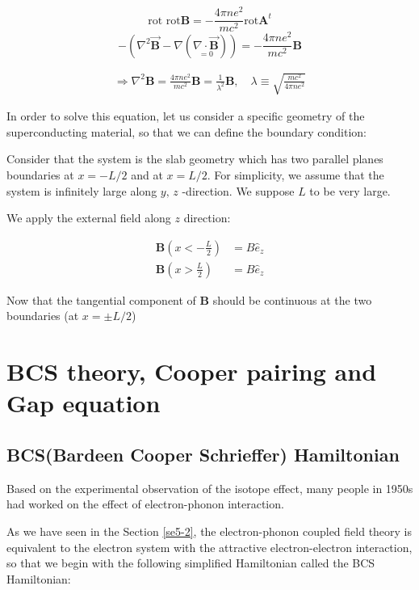 \[\text{rot\ rot}\bm{B} = -\frac{4\pi ne^2}{mc^2}\text{rot}\bm{A}^t \]
\[-\left(\nabla^2\vec{\bm{B}} - \nabla (\underset{=0}{\nabla \cdot \vec{\bm{B}}})\right) = -\frac{4\pi ne^2}{mc^2}\bm{B} \]

\begin{align} \tag{A}
\Rightarrow \nabla^2 \bm{B} = \frac{4\pi ne^2}{mc^2}\bm{B} = \frac{1}{\lambda^2}\bm{B},\quad \lambda \equiv \sqrt{\frac{mc^2}{4\pi ne^2}} 
\end{align}

In order to solve this equation, let us consider a specific geometry of the superconducting material, so that we can define the boundary condition: 

Consider that the system is the slab geometry which has two parallel planes boundaries at $x = -L/2$ and at $x = L/2$. For simplicity, we assume that the system is infinitely large along $y,\, z$ -direction. We suppose $L$ to be very large. 

We apply the external field along $z$ direction: 

\[\begin{split}
\bm B\left(x < -\frac{L}{2}\right) &= B\hat{e}_z\\
\bm B\left(x > \frac{L}{2}\right) &= B\hat{e}_z
\end{split} \]

Now that the tangential component of $\bm{B}$ should be continuous at the two boundaries (at $x = \pm L/2$)







\section{BCS theory, Cooper pairing and Gap equation}

\subsection{BCS(Bardeen Cooper Schrieffer) Hamiltonian}



Based on the experimental observation of the isotope effect, many people in 1950s had worked on the effect of electron-phonon interaction. 

As we have seen in the Section {\ref{se5-2}}, the electron-phonon coupled field theory is equivalent to the electron system with the attractive electron-electron interaction, so that we begin with the following simplified Hamiltonian called the BCS Hamiltonian: 

